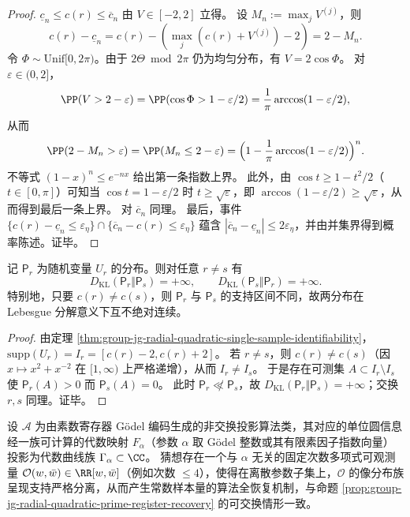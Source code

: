 \begin{proof}
\(\underline c_n\le c(r)\le \overline c_n\) 由 \(V\in[-2,2]\) 立得。
设 \(M_n:=\max_j V^{(j)}\)，则
\[
c(r)-\underline c_n=c(r)-(\max_j(c(r)+V^{(j)})-2)=2-M_n.
\]
令 \(\Phi\sim\mathrm{Unif}[0,2\pi)\)。由于 \(2\Theta\bmod 2\pi\) 仍为均匀分布，有 \(V=2\cos\Phi\)。
对 \(\varepsilon\in(0,2]\)，
\[
\PP(V>2-\varepsilon)=\PP(\cos\Phi>1-\varepsilon/2)=\frac{1}{\pi}\arccos(1-\varepsilon/2),
\]
从而
\[
\PP(2-M_n>\varepsilon)=\PP(M_n\le 2-\varepsilon)
=\Bigl(1-\frac{1}{\pi}\arccos(1-\varepsilon/2)\Bigr)^{n}.
\]
不等式 \((1-x)^n\le e^{-nx}\) 给出第一条指数上界。
此外，由 \(\cos t\ge 1-t^2/2\)（\(t\in[0,\pi]\)）可知当 \(\cos t=1-\varepsilon/2\) 时 \(t\ge \sqrt{\varepsilon}\)，即
\(
\arccos(1-\varepsilon/2)\ge \sqrt{\varepsilon}
\)，从而得到最后一条上界。
对 \(\overline c_n\) 同理。
最后，事件
\(
\{c(r)-\underline c_n\le \varepsilon_\eta\}\cap\{\overline c_n-c(r)\le \varepsilon_\eta\}
\)
蕴含 \(|\overline c_n-\underline c_n|\le 2\varepsilon_\eta\)，并由并集界得到概率陈述。证毕。
\end{proof}

\begin{proposition}\label{prop:group-jg-radial-quadratic-kl-infinite}
记 \(\mathsf P_r\) 为随机变量 \(U_r\) 的分布。则对任意 \(r\neq s\) 有
\[
D_{\mathrm{KL}}(\mathsf P_r\Vert \mathsf P_s)=+\infty,
\qquad
D_{\mathrm{KL}}(\mathsf P_s\Vert \mathsf P_r)=+\infty.
\]
特别地，只要 \(c(r)\neq c(s)\)，则 \(\mathsf P_r\) 与 \(\mathsf P_s\) 的支持区间不同，故两分布在 Lebesgue 分解意义下互不绝对连续。
\end{proposition}

\begin{proof}
由定理 \ref{thm:group-jg-radial-quadratic-single-sample-identifiability}，\(\mathrm{supp}(U_r)=I_r=[c(r)-2,c(r)+2]\)。
若 \(r\neq s\)，则 \(c(r)\neq c(s)\)（因 \(x\mapsto x^2+x^{-2}\) 在 \([1,\infty)\) 上严格递增），从而 \(I_r\neq I_s\)。
于是存在可测集 \(A\subset I_r\setminus I_s\) 使 \(\mathsf P_r(A)>0\) 而 \(\mathsf P_s(A)=0\)。
此时 \(\mathsf P_r\not\ll \mathsf P_s\)，故 \(D_{\mathrm{KL}}(\mathsf P_r\Vert \mathsf P_s)=+\infty\)；交换 \(r,s\) 同理。证毕。
\end{proof}

\begin{conjecture}[非交换投影的低阶可观测解码泛化]\label{conj:group-jg-noncommutative-low-order-observable-decoding}
设 \(\mathcal A\) 为由素数寄存器 Gödel 编码生成的非交换投影算法类，其对应的单位圆信息经一族可计算的代数映射 \(F_{\alpha}\)（参数 \(\alpha\) 取 Gödel 整数或其有限素因子指数向量）投影为代数曲线族 \(\Gamma_\alpha\subset\CC\)。
猜想存在一个与 \(\alpha\) 无关的固定次数多项式可观测量 \(\mathcal O(w,\bar w)\in\RR[w,\bar w]\)（例如次数 \(\le 4\)），使得在离散参数子集上，\(\mathcal O\) 的像分布族呈现支持严格分离，从而产生常数样本量的算法全恢复机制，与命题 \ref{prop:group-jg-radial-quadratic-prime-register-recovery} 的可交换情形一致。
\end{conjecture}

